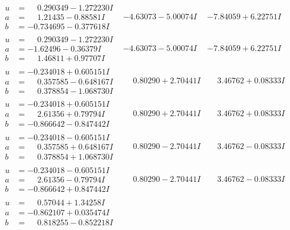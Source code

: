 \documentclass[1p]{elsarticle_modified}
\theoremstyle{definition}
\begin{document}
$$\begin{array}{c|c|c}
\begin{aligned}
u &= \phantom{-}0.290349 - 1.272230 I \\
a &= \phantom{-}1.21435 - 0.88581 I \\
b &= -0.734695 - 0.377618 I\end{aligned}
 & -4.63073 - 5.00074 I & -7.84059 + 6.22751 I \\ \hline\begin{aligned}
u &= \phantom{-}0.290349 - 1.272230 I \\
a &= -1.62496 - 0.36379 I \\
b &= \phantom{-}1.46811 + 0.97707 I\end{aligned}
 & -4.63073 - 5.00074 I & -7.84059 + 6.22751 I \\ \hline\begin{aligned}
u &= -0.234018 + 0.605151 I \\
a &= \phantom{-}0.357585 - 0.648167 I \\
b &= \phantom{-}0.378854 - 1.068730 I\end{aligned}
 & \phantom{-}0.80290 + 2.70441 I & \phantom{-}3.46762 + 0.08333 I \\ \hline\begin{aligned}
u &= -0.234018 + 0.605151 I \\
a &= \phantom{-}2.61356 + 0.79794 I \\
b &= -0.866642 - 0.847442 I\end{aligned}
 & \phantom{-}0.80290 + 2.70441 I & \phantom{-}3.46762 + 0.08333 I \\ \hline\begin{aligned}
u &= -0.234018 - 0.605151 I \\
a &= \phantom{-}0.357585 + 0.648167 I \\
b &= \phantom{-}0.378854 + 1.068730 I\end{aligned}
 & \phantom{-}0.80290 - 2.70441 I & \phantom{-}3.46762 - 0.08333 I \\ \hline\begin{aligned}
u &= -0.234018 - 0.605151 I \\
a &= \phantom{-}2.61356 - 0.79794 I \\
b &= -0.866642 + 0.847442 I\end{aligned}
 & \phantom{-}0.80290 - 2.70441 I & \phantom{-}3.46762 - 0.08333 I \\ \hline\begin{aligned}
u &= \phantom{-}0.57044 + 1.34258 I \\
a &= -0.862107 + 0.035474 I \\
b &= \phantom{-}0.818255 - 0.852218 I\end{aligned}

\end{array}$$
\end{document}
